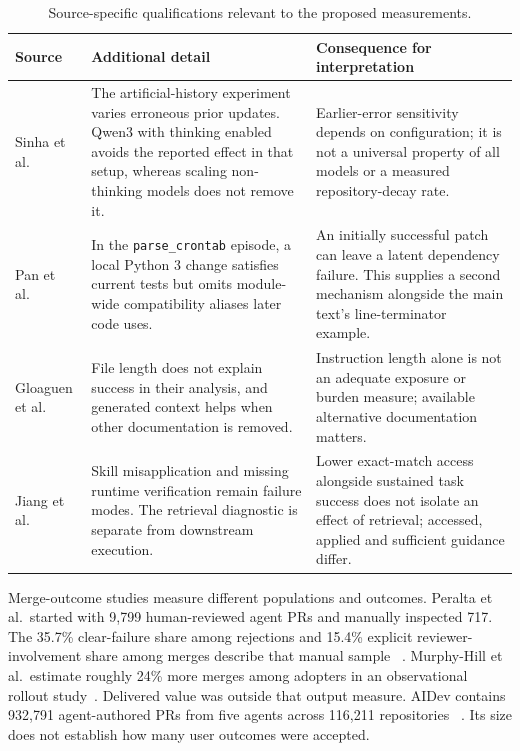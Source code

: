 \begin{table}[!htbp]
\centering\footnotesize
\caption{Source-specific qualifications relevant to the proposed measurements.}\label{tab:sourcequalifications}

\begin{tabularx}{\textwidth}{@{}L{2.2cm}YY@{}}
\toprule
Source & Additional detail & Consequence for interpretation \\
\midrule
Sinha et al.~\cite[Sec.~3.2, Figs.~5--6]{sinha2025illusion} &
The artificial-history experiment varies erroneous prior updates.
Qwen3 with thinking enabled avoids the reported effect in that setup,
whereas scaling non-thinking models does not remove it. &
Earlier-error sensitivity depends on configuration; it is not a universal
property of all models or a measured repository-decay rate. \\
Pan et al.~\cite[Sec.~5.1, Fig.~4]{pan2026swemaintain} &
In the \texttt{parse\_crontab} episode, a local Python 3 change satisfies
current tests but omits module-wide compatibility aliases later code uses. &
An initially successful patch can leave a latent dependency failure.
This supplies a second mechanism alongside the main text's line-terminator example. \\
Gloaguen et al.~\cite[Secs.~4.2--4.4]{gloaguen2026agentsmd} &
File length does not explain success in their analysis, and generated
context helps when other documentation is removed. &
Instruction length alone is not an adequate exposure or burden measure;
available alternative documentation matters. \\
Jiang et al.~\cite[Secs.~5.2--5.5]{jiang2026skills} &
Skill misapplication and missing runtime verification remain failure modes.
The retrieval diagnostic is separate from downstream execution. &
Lower exact-match access alongside sustained task success does not isolate
an effect of retrieval; accessed, applied and sufficient guidance differ. \\
\bottomrule
\end{tabularx}
\end{table}

Merge-outcome studies measure different populations and outcomes.
Peralta et al.\ started with 9,799 human-reviewed agent PRs and manually
inspected 717. The 35.7\% clear-failure share among rejections and 15.4\%
explicit reviewer-involvement share among merges describe that manual sample
~\cite{peralta2026merged}. Murphy-Hill et al.\ estimate roughly 24\% more merges among adopters in an
observational rollout study~\cite{murphyhill2026agents}. Delivered value
was outside that output measure. AIDev contains
932,791 agent-authored PRs from five agents across 116,211 repositories
~\cite{li2026aidev}. Its size does not establish how many user outcomes were accepted.

